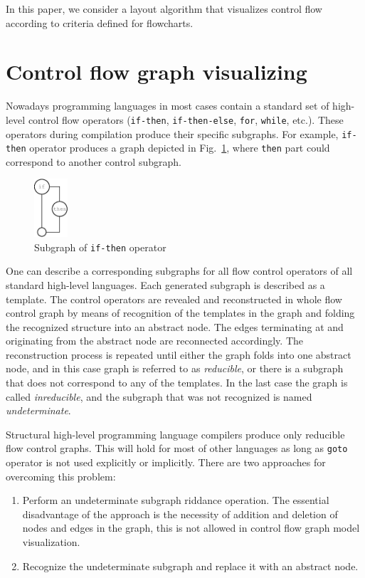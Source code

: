 \documentclass[conference]{IEEEtran}
\begin{document}
In this paper, we consider a layout algorithm that visualizes control flow according to criteria defined for flowcharts.

\section{Control flow graph visualizing}
\label{sec:cfg-vis}

Nowadays programming languages in most cases contain a standard set of high-level control flow operators (\texttt{if-then}, \texttt{if-then-else}, \texttt{for}, \texttt{while}, etc.).  These operators during compilation produce their specific subgraphs.  For example, \texttt{if-then} operator produces a graph depicted in Fig.~\ref{fig:IfSt}, where \texttt{then} part could correspond to another control subgraph.
\begin{figure}[htbp]
	\centering
		\includegraphics[width=0.11\textwidth]{Pic/Pic2.eps}
	\caption{Subgraph of \texttt{if-then} operator}
	\label{fig:IfSt}
\end{figure}

One can describe a corresponding subgraphs for all flow control operators of all standard high-level languages.  Each generated subgraph is described as a template.  The control operators are revealed and reconstructed in whole flow control graph by means of recognition of the templates in the graph and folding the recognized structure into an abstract node.  The edges terminating at and originating from the abstract node are reconnected accordingly.  The reconstruction process is repeated until either the graph folds into one abstract node, and in this case graph is referred to as \emph{reducible}, or there is a subgraph that does not correspond to any of the templates.  In the last case the graph is called \emph{inreducible}, and the subgraph that was not recognized is named \emph{undeterminate}.

Structural high-level programming language compilers produce only reducible flow control graphs.  This will hold for most of other languages as long as \texttt{goto} operator is not used explicitly or implicitly.  There are two approaches for overcoming this problem:
\begin{enumerate}
\item Perform an undeterminate subgraph riddance operation.  The essential disadvantage of the approach is the necessity of addition and deletion of nodes and edges in the graph, this is not allowed in control flow graph model visualization.
\item Recognize the undeterminate subgraph and replace it with an abstract node.
\end{enumerate}
\end{document}
